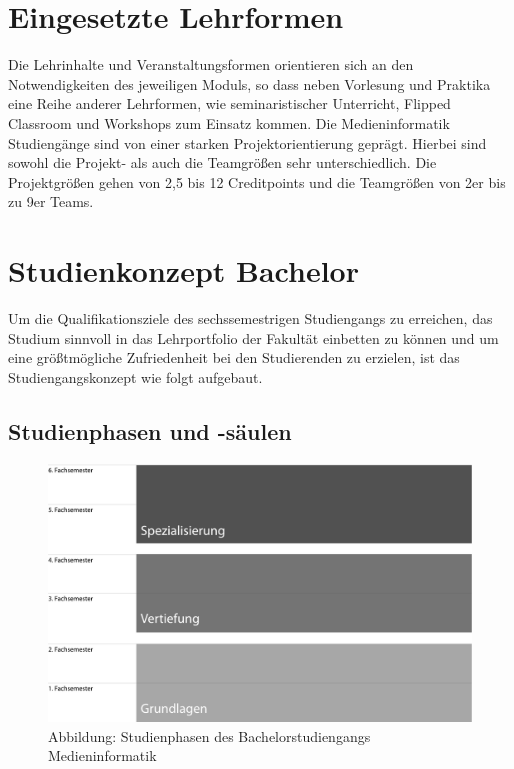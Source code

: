 \section{Eingesetzte Lehrformen}\label{eingesetzte-lehrformen}

Die Lehrinhalte und Veranstaltungsformen orientieren sich an den
Notwendigkeiten des jeweiligen Moduls, so dass neben Vorlesung und
Praktika eine Reihe anderer Lehrformen, wie seminaristischer Unterricht,
Flipped Classroom und Workshops zum Einsatz kommen. Die Medieninformatik
Studiengänge sind von einer starken Projektorientierung geprägt. Hierbei
sind sowohl die Projekt- als auch die Teamgrößen sehr unterschiedlich.
Die Projektgrößen gehen von 2,5 bis 12 Creditpoints und die Teamgrößen
von 2er bis zu 9er Teams.

\section{Studienkonzept Bachelor}\label{studienkonzept-bachelor}

Um die Qualifikationsziele des sechssemestrigen Studiengangs zu
erreichen, das Studium sinnvoll in das Lehrportfolio der Fakultät
einbetten zu können und um eine größtmögliche Zufriedenheit bei den
Studierenden zu erzielen, ist das Studiengangskonzept wie folgt
aufgebaut.

\subsection{Studienphasen und
-säulen}\label{studienphasen-und--suxe4ulen}

\begin{figure}[htbp][htbp]
\centering
\includegraphics[width=\columnwidth]{../anhaenge/bilder/ba-studienphasen.pdf}
\caption{Abbildung: Studienphasen des Bachelorstudiengangs
Medieninformatik}
\end{figure}

